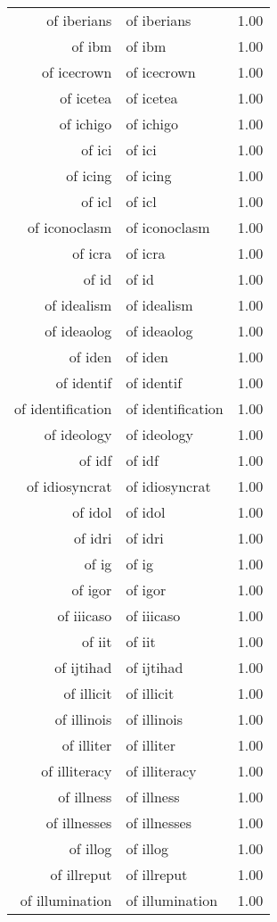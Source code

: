 \begin{table}[ht]
\begin{tabular}{rlr}
  of iberians & of iberians & 1.00 \\ 
  of ibm & of ibm & 1.00 \\ 
  of icecrown & of icecrown & 1.00 \\ 
  of icetea & of icetea & 1.00 \\ 
  of ichigo & of ichigo & 1.00 \\ 
  of ici & of ici & 1.00 \\ 
  of icing & of icing & 1.00 \\ 
  of icl & of icl & 1.00 \\ 
  of iconoclasm & of iconoclasm & 1.00 \\ 
  of icra & of icra & 1.00 \\ 
  of id & of id & 1.00 \\ 
  of idealism & of idealism & 1.00 \\ 
  of ideaolog & of ideaolog & 1.00 \\ 
  of iden & of iden & 1.00 \\ 
  of identif & of identif & 1.00 \\ 
  of identification & of identification & 1.00 \\ 
  of ideology & of ideology & 1.00 \\ 
  of idf & of idf & 1.00 \\ 
  of idiosyncrat & of idiosyncrat & 1.00 \\ 
  of idol & of idol & 1.00 \\ 
  of idri & of idri & 1.00 \\ 
  of ig & of ig & 1.00 \\ 
  of igor & of igor & 1.00 \\ 
  of iiicaso & of iiicaso & 1.00 \\ 
  of iit & of iit & 1.00 \\ 
  of ijtihad & of ijtihad & 1.00 \\ 
  of illicit & of illicit & 1.00 \\ 
  of illinois & of illinois & 1.00 \\ 
  of illiter & of illiter & 1.00 \\ 
  of illiteracy & of illiteracy & 1.00 \\ 
  of illness & of illness & 1.00 \\ 
  of illnesses & of illnesses & 1.00 \\ 
  of illog & of illog & 1.00 \\ 
  of illreput & of illreput & 1.00 \\ 
  of illumination & of illumination & 1.00 \\ 

\end{tabular}
\end{table}
